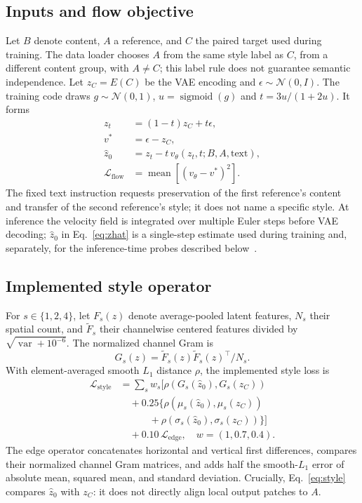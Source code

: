\documentclass[10pt,letterpaper]{article}
\begin{document}
\subsection{Inputs and flow objective}
Let $B$ denote content, $A$ a reference, and $C$ the paired target used during training. The data loader chooses $A$ from the same style label as $C$, from a different content group, with $A\ne C$; this label rule does not guarantee semantic independence. Let $z_C=E(C)$ be the VAE encoding and $\epsilon\sim\mathcal N(0,I)$. The training code draws $g\sim\mathcal N(0,1)$, $u=\operatorname{sigmoid}(g)$ and $t=3u/(1+2u)$. It forms
\begin{align}
 z_t &= (1-t)z_C+t\epsilon,\\
 v^*&=\epsilon-z_C,\\
 \widehat z_0&=z_t-t\,v_\theta(z_t,t;B,A,\text{text}),\label{eq:zhat}\\
 \mathcal L_{\mathrm{flow}}&=\operatorname{mean}\!\left[(v_\theta-v^*)^2\right].
 \label{eq:flow}
\end{align}
The fixed text instruction requests preservation of the first reference's content and transfer of the second reference's style; it does not name a specific style. At inference the velocity field is integrated over multiple Euler steps before VAE decoding; $\widehat z_0$ in Eq.~\eqref{eq:zhat} is a single-step estimate used during training and, separately, for the inference-time probes described below~\cite{flow2022}.

\subsection{Implemented style operator}
For $s\in\{1,2,4\}$, let $F_s(z)$ denote average-pooled latent features, $N_s$ their spatial count, and $\widetilde F_s$ their channelwise centered features divided by $\sqrt{\operatorname{var}+10^{-6}}$. The normalized channel Gram is
\begin{equation}
 G_s(z)=\widetilde F_s(z)\widetilde F_s(z)^\top/N_s.
 \label{eq:gram}
\end{equation}
With element-averaged smooth $L_1$ distance $\rho$, the implemented style loss is
\begin{align}
 \mathcal L_{\mathrm{style}}
 &= \sum_s w_s\bigl[\rho(G_s(\widehat z_0),G_s(z_C))\nonumber\\
 &\quad+0.25\{\rho(\mu_s(\widehat z_0),\mu_s(z_C))\nonumber\\
 &\qquad\quad+\rho(\sigma_s(\widehat z_0),\sigma_s(z_C))\}\bigr]\nonumber\\
 &\quad+0.10\,\mathcal L_{\mathrm{edge}},
 \quad w=(1,0.7,0.4).
 \label{eq:style}
\end{align}
The edge operator concatenates horizontal and vertical first differences, compares their normalized channel Gram matrices, and adds half the smooth-$L_1$ error of absolute mean, squared mean, and standard deviation. Crucially, Eq.~\eqref{eq:style} compares $\widehat z_0$ with $z_C$: it does not directly align local output patches to $A$.
\end{document}
